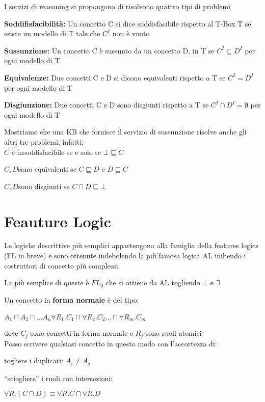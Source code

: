 I servizi di reasoning si propongono di risolvono quattro tipi di
problemi

\textbf{Soddifisfacibilità: }Un concetto C si dice soddisfacibile
rispetto al T-Box T se esiste un modello di T tale che $C^{I}$ non
è vuoto

\textbf{Sussunzione: }Un concetto C è sussunto da un concetto D, in
T se $C^{I}\subseteq D^{I}$ per ogni modello di T

\textbf{Equivalenze: }Due concetti C e D si dicono equivalenti rispetto
a T se $C^{I}=D^{I}$per ogni modello di T

\textbf{Disgiunzione: }Due concetti C e D sono disgiunti rispetto
a T se $C^{I}\cap D^{I}=\emptyset$ per ogni modello di T

Mostriamo che una KB che fornisce il servizio di sussunzione risolve
anche gli altri tre problemi, infatti:\\


$C$ è insoddisfacibile se e solo se $\bot\sqsubseteq C$ 

$C,D$sono equivalenti se $C\sqsubseteq D$ e $D\sqsubseteq C$

$C,D$sono disgiunti se $C\sqcap D\sqsubseteq\bot$


\section{Feauture Logic}

Le logiche descrittive più semplici appartengono alla famiglia della
features logics (FL in breve) e sono ottenute indebolendo la più\'{ }famosa
logica AL inibendo i costruttori di concetto più complessi.

La più semplice di queste è $FL_{0}$ che si ottiene da AL togliendo
$\bot$ e $\exists$

Un concetto in \textbf{forma normale }è del tipo:

$A_{1}\sqcap A_{2}\sqcap\dot{\dots A_{n}\forall R_{1}.C_{1}\sqcap\forall R_{2}.C_{2}\dots\sqcap\forall R_{m}.C_{m}}$

dove $C_{j}$ sono concetti in forma normale e $R_{j}$ sono ruoli
atomici\\


Posso scrivere qualsiasi concetto in questo modo con l'accortezza
di:

togliere i duplicati: $A_{i}\neq A_{j}$

``sciogliere'' i ruoli con intersezioni: 

$\forall R.(C\sqcap D)\equiv\forall R.C\sqcap\forall R.D$

